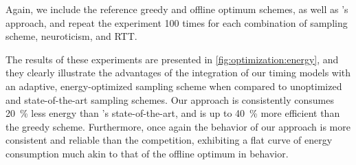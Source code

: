 Again, we include the reference greedy and offline optimum schemes, as well as \textcite{Wang2019Towards}'s approach, and repeat the experiment \num{100} times for each combination of sampling scheme, neuroticism, and \ac{RTT}.

The results of these experiments are presented in \cref{fig:optimization:energy}, and they clearly illustrate the advantages of the integration of our timing models with an adaptive, energy-optimized sampling scheme when compared to unoptimized and state-of-the-art sampling schemes.
Our approach is consistently consumes \SI{20}{\percent} less energy than \textcite{Wang2019Towards}'s state-of-the-art, and is up to \SI{40}{\percent} more efficient than the greedy scheme.
Furthermore, once again the behavior of our approach is more consistent and reliable than the competition, exhibiting a flat curve of energy consumption much akin to that of the offline optimum in behavior.
